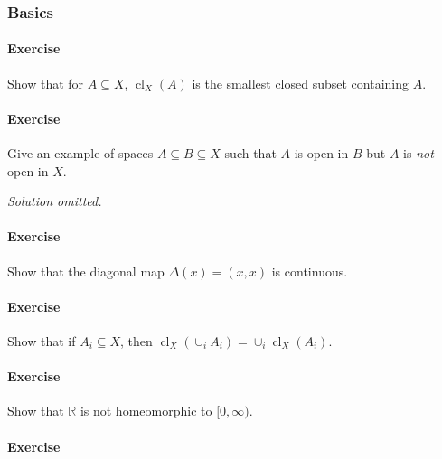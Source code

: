 \hypertarget{basics}{%
\subsubsection{Basics}\label{basics}}

\hypertarget{exercise}{%
\paragraph{Exercise}\label{exercise}}

Show that for \(A\subseteq X\), \({ \operatorname{cl}} _X(A)\) is the
smallest closed subset containing \(A\).

\hypertarget{exercise-1}{%
\paragraph{Exercise}\label{exercise-1}}

Give an example of spaces \(A\subseteq B \subseteq X\) such that \(A\)
is open in \(B\) but \(A\) is \emph{not} open in \(X\).

\emph{Solution omitted.}

\hypertarget{exercise-2}{%
\paragraph{Exercise}\label{exercise-2}}

Show that the diagonal map \(\Delta(x) = (x, x)\) is continuous.

\hypertarget{exercise-3}{%
\paragraph{Exercise}\label{exercise-3}}

Show that if \(A_i \subseteq X\), then
\({ \operatorname{cl}} _X(\cup_i A_i) = \cup_i { \operatorname{cl}} _X(A_i)\).

\hypertarget{exercise-4}{%
\paragraph{Exercise}\label{exercise-4}}

Show that \({\mathbb{R}}\) is not homeomorphic to \([0, \infty)\).

\hypertarget{exercise-5}{%
\paragraph{Exercise}\label{exercise-5}}


